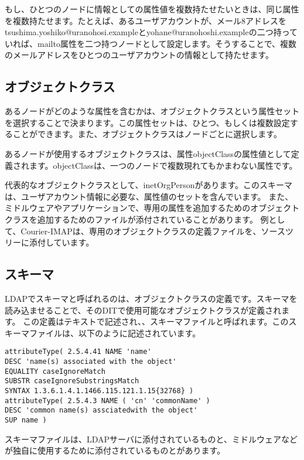 もし、ひとつのノードに情報としての属性値を複数持たせたいときは、同じ属性を複数持たせます。たとえば、あるユーザアカウントが、メール8アドレスをtsushima.yoshiko@uranohosi.exampleとyohane@uranohoshi.exampleの二つ持っていれば、mailto属性を二つ持つノードとして設定します。そうすることで、複数のメールアドレスをひとつのユーザアカウントの情報として持たせます。



\subsection{オブジェクトクラス}

あるノードがどのような属性を含むかは、オブジェクトクラスという属性セットを選択することで決まります。この属性セットは、ひとつ、もしくは複数設定することができます。また、オブジェクトクラスはノードごとに選択します。

あるノードが使用するオブジェクトクラスは、属性objectClassの属性値として定義されます。objectClassは、一つのノードで複数現れてもかまわない属性です。

代表的なオブジェクトクラスとして、inetOrgPersonがあります。このスキーマは、ユーザアカウント情報に必要な、属性値のセットを含んでいます。
また、ミドルウェアやアプリケーションで、専用の属性を追加するためのオブジェクトクラスを追加するためのファイルが添付されていることがあります。
例として、Courier-IMAPは、専用のオブジェクトクラスの定義ファイルを、ソースツリーに添付しています。


\subsection{スキーマ}
LDAPでスキーマと呼ばれるのは、オブジェクトクラスの定義です。スキーマを読み込ませることで、そのDITで使用可能なオブジェクトクラスが定義されます。
この定義はテキストで記述され、、スキーマファイルと呼ばれます。このスキーマファイルは、以下のように記述されています。

\begin{verbatim}
attributeType( 2.5.4.41 NAME 'name'
DESC 'name(s) associated with the object'
EQUALITY caseIgnoreMatch
SUBSTR caseIgnoreSubstringsMatch
SYNTAX 1.3.6.1.4.1.1466.115.121.1.15{32768} )
attributeType( 2.5.4.3 NAME ( 'cn' 'commonName' )
DESC 'common name(s) assciatedwith the object'
SUP name )
\end{verbatim}

スキーマファイルは、LDAPサーバに添付されているものと、ミドルウェアなどが独自に使用するために添付されているものとがあります。


